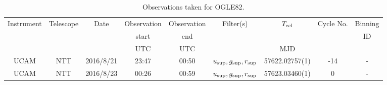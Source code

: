 \begin{table}
	\begin{center}
		\caption{Observations taken for OGLE82.}
		\label{table:observing:observation logs OGLE82}
		\begin{tabular}{ccccccccc}
			\hline
			Instrument & Telescope & Date & Observation  & Observation  & Filter(s) & $T_{\rm ecl}$ & Cycle No. & Binning \\
			 &  &  &  start &  end &  &  &  & ID \\
			 &  &  & UTC & UTC &  & MJD &  &  \\
			\hline
			\hline
			UCAM & NTT & 2016/8/21 & 23:47 & 00:50 & $u_{\rm sup},g_{\rm sup},r_{\rm sup}$ & 57622.02757(1) & -14 & - \\
			UCAM & NTT & 2016/8/23 & 00:26 & 00:59 & $u_{\rm sup},g_{\rm sup},r_{\rm sup}$ & 57623.03460(1) &   0 & - \\
		   \hline
		\end{tabular}
	\end{center}
\end{table}